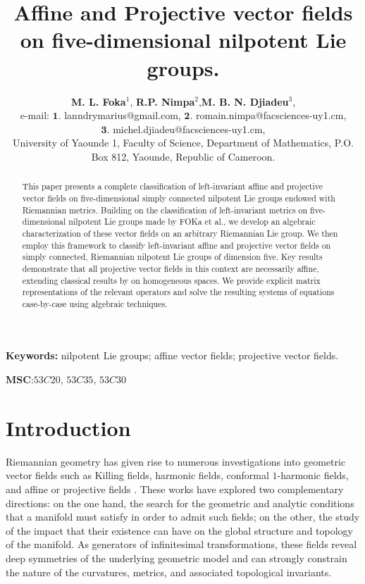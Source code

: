 \documentclass[10pt]{article}
\date{\empty}
\date{}
\title{Affine and Projective vector fields on five-dimensional nilpotent Lie groups.}
\newcommand\blfootnote[1]{%
	\begingroup
	\renewcommand\thefootnote{}\footnote{#1}%
	\addtocounter{footnote}{-1}%
	\endgroup
}
\begin{document}
	
	\maketitle
	\begin{center}
		\author{ \textbf{M. L. Foka}$^{1}$, \quad \textbf{   R.P. Nimpa}$^{2}$,\quad \textbf{M. B. N.  Djiadeu}$^{3}$,\\
			\small{e-mail: $\textbf{1}.$ lanndrymarius@gmail.com, \quad
				$\textbf{2}.$ romain.nimpa@facsciences-uy1.cm, \\
				$\textbf{3}.$  michel.djiadeu@facsciences-uy1.cm,   \\
				University of Yaounde 1, Faculty of Science, Department of
				Mathematics,  P.O. Box 812, Yaounde, Republic of Cameroon.}}
	\end{center}
	
	
	\begin{abstract}
This paper presents a complete classification of left-invariant affine and projective vector fields on five-dimensional simply connected nilpotent Lie groups endowed with Riemannian metrics. Building on the classification of left-invariant metrics on five-dimensional nilpotent Lie groups made by FOKa et al., we develop an algebraic characterization of these vector fields on an arbitrary Riemannian Lie group. We then employ this framework to classify left-invariant affine and projective vector fields on simply connected, Riemannian nilpotent Lie groups of dimension five.
 Key results demonstrate that all projective vector fields in this context are necessarily affine, extending classical results by \cite{Kobayashi1963} on homogeneous spaces. We provide explicit matrix representations of the relevant operators and solve the resulting systems of equations case-by-case using algebraic techniques.
\end{abstract}

\textbf{Keywords:} nilpotent Lie groups; affine vector fields; projective vector fields.
\vspace{0.5cm}

\textbf{MSC}:\quad $53C20,\, 53C35,\, 53C30$

\section*{Introduction}


Riemannian geometry has given rise to numerous investigations into geometric vector fields such as Killing fields, harmonic fields, conformal $1$-harmonic fields, and affine or projective fields \cite{cal,Dod,Foka}. These works have explored two complementary directions: on the one hand, the search for the geometric and analytic conditions that a manifold must satisfy in order to admit such fields; on the other, the study of the impact that their existence can have on the global structure and topology of the manifold. As generators of infinitesimal transformations, these fields reveal deep symmetries of the underlying geometric model and can strongly constrain the nature of the curvatures, metrics, and associated topological invariants.
\end{document}
